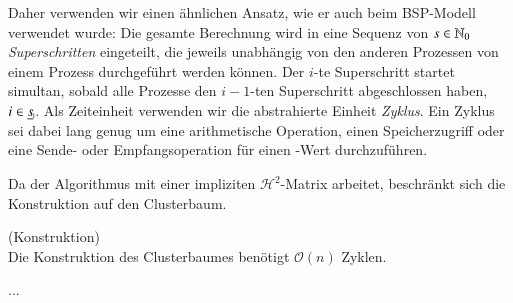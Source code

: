   Daher verwenden wir einen ähnlichen Ansatz, wie er auch beim BSP-Modell \citep{bsp} verwendet wurde: Die gesamte Berechnung wird in eine Sequenz von $s \in \mathbb{N}_0$ \textit{Superschritten} eingeteilt,
  die jeweils unabhängig von den anderen Prozessen von einem Prozess durchgeführt werden können. Der $i$-te Superschritt startet simultan, sobald alle Prozesse den $i-1$-ten Superschritt abgeschlossen
  haben, $i \in \haken{s}$. Als Zeiteinheit verwenden wir die abstrahierte Einheit \textit{Zyklus}. Ein Zyklus sei dabei lang genug um eine arithmetische Operation, einen Speicherzugriff oder eine Sende-
  oder Empfangsoperation für einen -Wert durchzuführen.
  
  Da der Algorithmus mit einer impliziten $\mathcal{H}^2$-Matrix arbeitet, beschränkt sich die Konstruktion auf den Clusterbaum.
  
  \begin{lem}
    (Konstruktion)\\
    Die Konstruktion des Clusterbaumes benötigt $\mathcal{O}(n)$ Zyklen.
  \end{lem}
  
  ...
  
